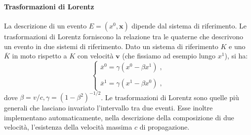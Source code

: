 \documentclass[12pt,a4paper]{report}
\theoremstyle{definition}
\begin{document}
\textbf{Trasformazioni di Lorentz} \\
\\
La descrizione di un evento $E=(x^0,\mathbf{x})$ dipende dal sistema di riferimento. Le trasformazioni di Lorentz forniscono la relazione tra le quaterne che descrivono un evento in due sistemi di riferimento. Dato un sistema di riferimento $K$ e uno $\overline{K}$ in moto rispetto a $K$ con velocità $\mathbf{v}$ (che fissiamo ad esempio lungo $x^1$), si ha:
\begin{equation}
\begin{cases}
\overline{x}^0=\gamma(x^0-\beta x^1)\;, \\
\\
\overline{x}^1=\gamma(x^1-\beta x^0)\;,
\end{cases}
\end{equation}
dove $\beta=v/c, \gamma=(1-\beta^2)^{-1/2}$. Le trasformazioni di Lorentz sono quelle più generali che lasciano invariato l'intervallo tra due eventi. Esse inoltre implementano automaticamente, nella descrizione della composizione di due velocità, l'esistenza della velocità massima $c$ di propagazione. \\
\end{document}
